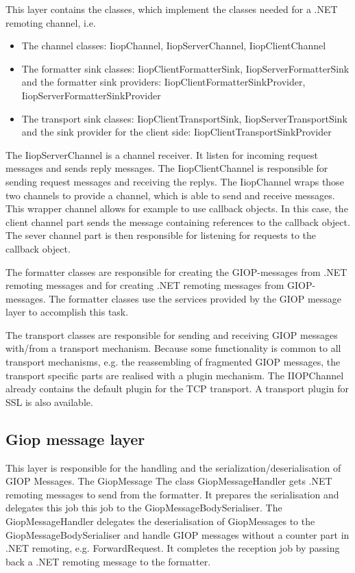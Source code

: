 \documentclass[a4paper]{report}
\begin{document}
This layer contains the classes, which implement the classes needed for a .NET remoting channel, i.e.
\begin{itemize}
\item The channel classes: IiopChannel, IiopServerChannel, IiopClientChannel
\item The formatter sink classes: IiopClientFormatterSink, IiopServerFormatterSink and the formatter sink providers: IiopClientFormatterSinkProvider, IiopServerFormatterSinkProvider
\item The transport sink classes: IiopClientTransportSink, IiopServerTransportSink and the sink provider for the client side: IiopClientTransportSinkProvider
\end{itemize}
The IiopServerChannel is a channel receiver. It listen for incoming request messages and sends reply messages. The IiopClientChannel
is responsible for sending request messages and receiving the replys.
The IiopChannel wraps those two channels to provide a channel, which is able to send and receive messages.
This wrapper channel allows for example to use callback objects. In this case, the client channel part sends the message containing 
references to the callback object. The sever channel part is then responsible for listening for requests to the callback object.

The formatter classes are responsible for creating the GIOP-messages from .NET remoting messages and for
creating .NET remoting messages from GIOP-messages. The formatter classes use the services provided by the
GIOP message layer to accomplish this task.

The transport classes are responsible for sending and receiving GIOP messages with/from a transport mechanism.
Because some functionality is common to all transport mechanisms, e.g. the reassembling of fragmented GIOP messages,
the transport specific parts are realised with a plugin mechanism. The IIOPChannel already contains
the default plugin for the TCP transport. A transport plugin for SSL is also available.

\subsection{Giop message layer}
This layer is responsible for the handling and the serialization/deserialisation of GIOP Messages. 
The GiopMessage The class GiopMessageHandler gets .NET remoting messages to send from the formatter. It prepares the serialisation and delegates this job
this job to the GiopMessageBodySerialiser. The GiopMessageHandler delegates the deserialisation of GiopMessages to
the GiopMessageBodySerialiser and handle GIOP messages without a counter part in .NET remoting, e.g. ForwardRequest. It
completes the reception job by passing back a .NET remoting message to the formatter.
\end{document}
